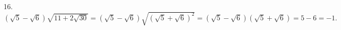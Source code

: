 16. $(\sqrt{5}-\sqrt{6})\sqrt{11+2\sqrt{30}}=(\sqrt{5}-\sqrt{6})\sqrt{(\sqrt{5}+\sqrt{6})^2}=(\sqrt{5}-\sqrt{6})(\sqrt{5}+\sqrt{6})=5-6=-1.$\\

